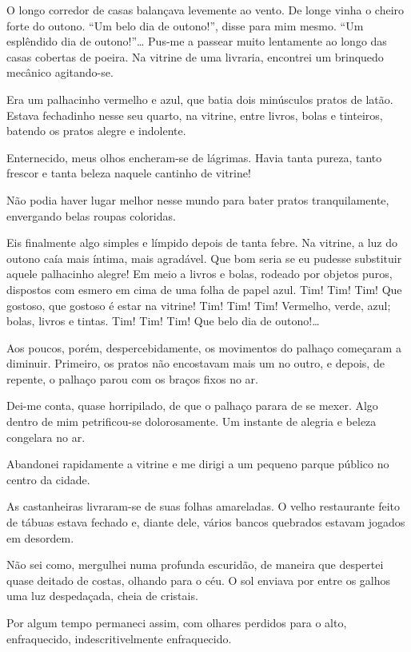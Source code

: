 O longo corredor de casas balançava levemente ao vento. De longe vinha o cheiro forte do outono. ``Um belo dia de outono!'', disse para mim mesmo. ``Um esplêndido dia de outono!''\ldots{}
Pus-me a passear muito lentamente ao longo das casas cobertas de poeira. Na vitrine de uma livraria, encontrei um brinquedo mecânico agitando-se.

Era um palhacinho vermelho e azul, que batia dois minúsculos pratos de latão. Estava fechadinho nesse seu quarto, na vitrine, entre livros, bolas e tinteiros, batendo os pratos alegre e indolente.

Enternecido, meus olhos encheram-se de lágrimas. Havia tanta pureza, tanto frescor e tanta beleza naquele cantinho de vitrine!

Não podia haver lugar melhor nesse mundo para bater pratos tranquilamente, envergando belas roupas coloridas.

Eis finalmente algo simples e límpido depois de tanta febre. Na vitrine, a luz do outono caía mais íntima, mais agradável. Que bom seria se eu pudesse substituir aquele palhacinho alegre! Em meio a livros e bolas, rodeado por objetos puros, dispostos com esmero em cima de uma folha de papel azul. Tim! Tim! Tim! Que gostoso, que gostoso é estar na vitrine! Tim! Tim! Tim! Vermelho, verde, azul; bolas, livros e tintas. Tim! Tim! Tim! Que belo dia de outono!\ldots{}

Aos poucos, porém, despercebidamente, os movimentos do palhaço começaram a diminuir. Primeiro, os pratos não encostavam mais um no outro, e depois, de repente, o palhaço parou com os braços fixos no ar.

Dei-me conta, quase horripilado, de que o palhaço parara de se mexer. Algo dentro de mim petrificou-se dolorosamente. Um instante de alegria e beleza congelara no ar.

Abandonei rapidamente a vitrine e me dirigi a um pequeno parque público no centro da cidade.

As castanheiras livraram-se de suas folhas amareladas. O velho restaurante feito de tábuas estava fechado e, diante dele, vários bancos quebrados estavam jogados em desordem.

Não sei como, mergulhei numa profunda escuridão, de maneira que despertei quase deitado de costas, olhando para o céu. O sol enviava por entre os galhos uma luz despedaçada, cheia de cristais.

Por algum tempo permaneci assim, com olhares perdidos para o alto, enfraquecido, indescritivelmente enfraquecido.

